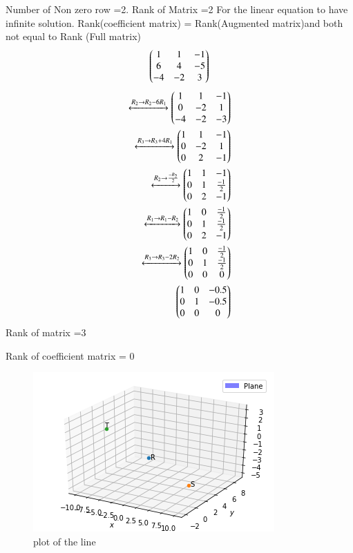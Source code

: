 \documentclass[journal,12pt,twocolumn]{IEEEtran}
\begin{document}
Number of Non zero row =2.
Rank of Matrix =2
For the linear equation to have infinite solution.
Rank(coefficient matrix) = Rank(Augmented matrix)and both not equal to  Rank (Full matrix)
\begin{align}
\begin{pmatrix}1 & 1 & -1\\6 & 4 & -5\\-4 & -2 & 3\end{pmatrix}
\end{align}
\begin{align}
\xleftrightarrow{R_2\rightarrow{R_2-6R_1}}
\begin{pmatrix}1 & 1 & -1\\0 & -2 & 1\\-4 & -2 &-3\end{pmatrix}
\\
\xleftrightarrow{R_3\rightarrow{R_3+4R_1}}
\begin{pmatrix}1 & 1 & -1\\0 & -2 & 1\\0 & 2 & -1\end{pmatrix}
\\
\xleftrightarrow{R_2\rightarrow\frac{-R_2}{2}}\begin{pmatrix}1 & 1 & -1\\0 & 1 & \frac{-1}{2}\\0 & 2 & -1\end{pmatrix}
\\
\xleftrightarrow{R_1\rightarrow{R_1-R_2}}\begin{pmatrix}1 & 0 & \frac{-1}{2}\\0 & 1 & \frac{-1}{2}\\0 & 2 & -1\end{pmatrix}
\\
\xleftrightarrow{R_3\rightarrow{R_3-2R_2}}
\begin{pmatrix}1 & 0 & \frac{-1}{2}\\0 & 1 & \frac{-1}{2}\\0 & 0 & 0\end{pmatrix}
\\
\begin{pmatrix}1 & 0 & -0.5\\0 & 1 & -0.5\\0 & 0 & 0\end{pmatrix}
\end{align}
Rank of matrix =3

Rank of coefficient matrix = 0
\begin{figure}[ht]
\centering
\includegraphics[width=\columnwidth]{figure.png}
\caption{plot of the line}
\label{Plot of the line}
\end{figure}
\end{document}
